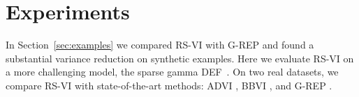 

\section{Experiments}\label{sec:experiments}
\glsresetall

In Section~\ref{sec:examples} we compared \gls{RS-VI} with \gls{G-REP} and found a substantial variance reduction on synthetic examples. Here we evaluate \gls{RS-VI} on a more challenging model, the sparse gamma \gls{DEF}~\citep{Ranganath2015}. On two real datasets, we compare \gls{RS-VI} with state-of-the-art methods: \gls{ADVI} \citep{Kucukelbir2015,Kucukelbir2016}, \gls{BBVI} \citep{Ranganath2014}, and \gls{G-REP} \citep{RuizTB2016}.

